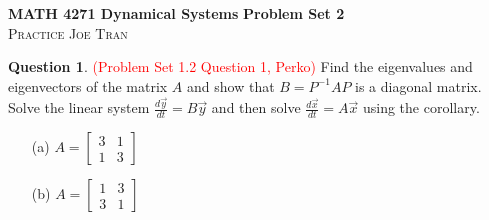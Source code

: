 \documentclass[11pt]{article}
\theoremstyle{definition}\newtheorem{definition}{Definition}
\theoremstyle{definition}\newtheorem{question}{Question}
\theoremstyle{definition}\newtheorem*{solution}{Solution}
\theoremstyle{definition}\newtheorem{example}{Example}
\theoremstyle{definition}\newtheorem{notation}{Notation}
\theoremstyle{theorem}\newtheorem{theorem}{Theorem}
\theoremstyle{theorem}\newtheorem{corollary}{Corollary}
\theoremstyle{theorem}\newtheorem{lemma}{Lemma}
\theoremstyle{theorem}\newtheorem{proposition}{Proposition}
\begin{document}
\noindent \textbf{MATH 4271 Dynamical Systems} \hfill \textbf{Problem Set 2} \\
\textsc{Practice} \hfill \textsc{Joe Tran}

\begin{question}
    \textcolor{red}{(Problem Set 1.2 Question 1, Perko)} Find the eigenvalues and eigenvectors of the matrix $A$ and show that $B = P^{-1}AP$ is a diagonal matrix. Solve the linear system $\frac{d\vec{y}}{dt} = B\vec{y}$ and then solve $\frac{d\vec{x}}{dt} = A\vec{x}$ using the corollary.
    \begin{itemize}
        \item[(a)] $A = \begin{bmatrix} 3 & 1 \\ 1 & 3 \end{bmatrix}$
        \item[(b)] $A = \begin{bmatrix} 1 & 3 \\ 3 & 1 \end{bmatrix}$
    \end{itemize}
\end{question}
\end{document}
